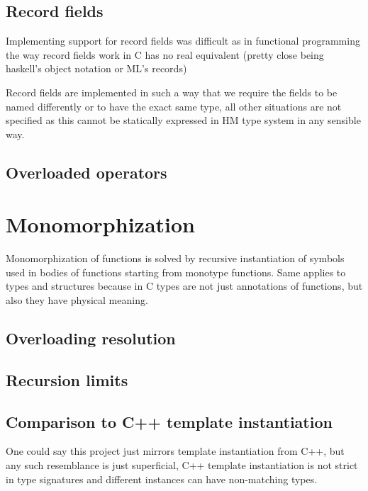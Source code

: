 \subsection{Record fields}

Implementing support for record fields was difficult as in functional programming the way
record fields work in C has no real equivalent (pretty close being haskell's object notation or ML's records)

Record fields are implemented in such a way that we require the fields to be named differently
or to have the exact same type, all other situations are not specified as this cannot be
statically expressed in HM type system in any sensible way.


\subsection{Overloaded operators}

\section{Monomorphization}

Monomorphization of functions is solved by recursive instantiation of symbols used in bodies of functions
starting from monotype functions. Same applies to types and structures because in C types are not just
annotations of functions, but also they have physical meaning.

\subsection{Overloading resolution}

\subsection{Recursion limits}

\subsection{Comparison to C++ template instantiation}

One could say this project just mirrors template instantiation from C++, but any such resemblance is just
superficial, C++ template instantiation is not strict in type signatures and different instances can have
non-matching types.

